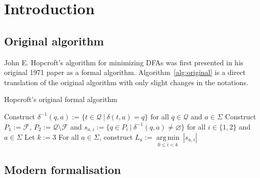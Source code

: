 \documentclass[12pt, a4 paper]{article}
\theoremstyle{definition}
\begin{document}
\section{Introduction}
\subsection{Original algorithm}
John E. Hopcroft's algorithm for minimizing DFAs was first presented in his original 1971 paper \cite{Hop71} as a formal algorithm. Algorithm~\ref{alg:original} is a direct translation of the original algorithm with only slight changes in the notations.

\begin{algorithm}[H]
\SetAlgoLined
\caption{Hopcroft's original formal algorithm}
\label{alg:original}
Construct $\delta^{-1}(q, a) := \{t \in \mathcal{Q}\ |\ \delta(t, a) = q\}$ for all $q \in \mathcal{Q}$ and $a \in \Sigma$ \;\label{alg:original:1}
Construct $P_1 := \mathcal{F}$, $P_2 := \mathcal{Q} \setminus \mathcal{F}$ and $s_{a,i} := \{q \in P_i \ | \ \delta^{-1}(q, a) \neq \varnothing \}$ for all $i \in \{1, 2\}$ and $a \in \Sigma$ \;
Let $k := 3$ \;
For all $a \in \Sigma$, construct $L_a := \underset{0 \leq i < k}{\operatorname*{arg\,min}}\ \left| s_{a, i} \right|$ \; \label{alg:original:4}
\end{algorithm}

\subsection{Modern formalisation}
\end{document}
